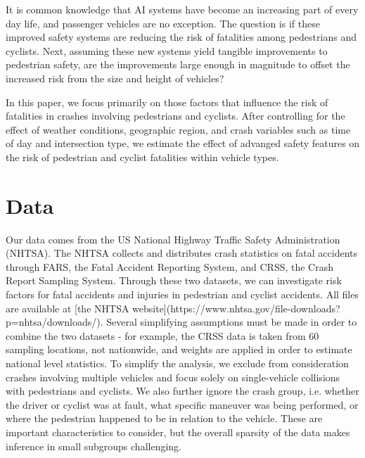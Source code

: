 \documentclass[12pt]{article}
\begin{document}
It is common knowledge that AI systems have become an increasing part of every day life, and passenger
vehicles are no exception. The question is if these improved safety systems are reducing the risk of fatalities
among pedestrians and cyclists. Next, assuming these new systems yield tangible improvements to pedestrian safety,
are the improvements large enough in magnitude to offset the increased risk from the size and height of vehicles?

In this paper, we focus primarily on those factors that influence the risk of fatalities in crashes involving pedestrians
and cyclists. After controlling for the effect of weather conditions,
geographic region, and crash variables such as time of day and intersection type, we estimate the effect
of advanged safety features on the risk of pedestrian and cyclist fatalities within vehicle types.


\section{Data}

Our data comes from the US National Highway Traffic Safety Administration (NHTSA). The NHTSA collects and distributes 
crash statistics on fatal accidents through FARS, the Fatal Accident Reporting System, and CRSS, the Crash Report 
Sampling System. Through these two datasets, we can investigate risk factors for fatal accidents and injuries in 
pedestrian and cyclist accidents. All files are available at 
[the NHTSA website](https://www.nhtsa.gov/file-downloads?p=nhtsa/downloads/). Several simplifying assumptions must be 
made in order to combine the two datasets - for example, the CRSS data is taken from 60 sampling locations, not 
nationwide, and weights are applied in order to estimate national level 
statistics\cite{national_highway_traffic_safety_administration_crash_nodate}.  To simplify the analysis, we exclude 
from consideration crashes involving multiple vehicles and focus solely on single-vehicle collisions with pedestrians 
and cyclists. We also further ignore the crash group, i.e. whether the driver or cyclist was at fault, what 
specific maneuver was being performed, or where the pedestrian happened to be in relation to the vehicle. These are 
important characteristics to consider, but the overall sparsity of the data makes inference in small subgroups
challenging.

\end{document}
